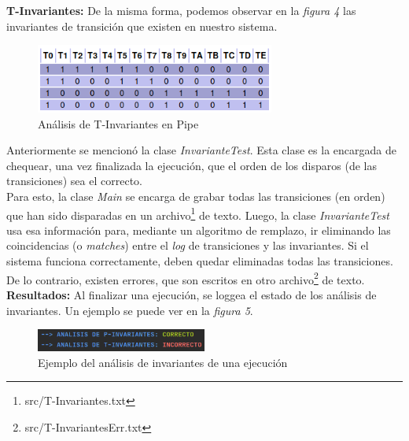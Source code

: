 \documentclass{article}
\newcommand{\fninv}{src/T-Invariantes.txt}
\newcommand{\fninverr}{src/T-InvariantesErr.txt}
\begin{document}
\begin{flushleft}
        \textbf{T-Invariantes:} \newline \newline
        De la misma forma, podemos observar en la \emph{figura 4} las invariantes de transición
        que existen en nuestro sistema. \\
        \begin{figure}[h]
            \includegraphics[width=0.7\textwidth, center]{t-invariante.png}
            \caption{Análisis de T-Invariantes en Pipe}
        \end{figure}   
        Anteriormente se mencionó la clase \emph{InvarianteTest}. Esta clase es la encargada
        de chequear, una vez finalizada la ejecución, que el orden de los disparos (de las 
        transiciones) sea el correcto. \\
        Para esto, la clase \emph{Main} se encarga de grabar todas las transiciones (en orden) 
        que han sido disparadas en un archivo\footnote{\fninv} de texto. Luego, la
        clase \emph{InvarianteTest} usa esa información para, mediante un algoritmo de remplazo,
        ir eliminando las coincidencias (o \emph{matches}) entre el \emph{log} de transiciones y
        las invariantes. Si el sistema funciona correctamente, deben quedar eliminadas todas las
        transiciones. De lo contrario, existen errores, que son escritos en otro 
        archivo\footnote{\fninverr} de texto. \newline \newline
        \textbf{Resultados:} \newline \newline
        Al finalizar una ejecución, se loggea el estado de los análisis de invariantes. Un ejemplo
        se puede ver en la \emph{figura 5}. \\
        \begin{figure}[h]
            \includegraphics[width=0.5\textwidth, center]{analisis-invariantes-ej.png}
            \caption{Ejemplo del análisis de invariantes de una ejecución}
        \end{figure}

\end{flushleft}
\end{document}
